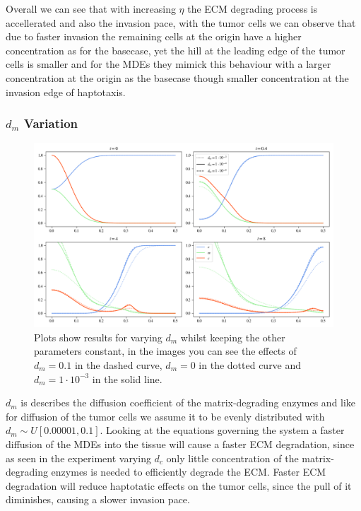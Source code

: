 Overall we can see that with increasing $\eta$ the ECM degrading process is accellerated and also the invasion pace, with the tumor cells we can observe that due to faster invasion the remaining cells at the origin have a higher concentration as for the basecase, yet the hill at the leading edge of the tumor cells is smaller and for the MDEs they mimick this behaviour with a larger concentration at the origin as the basecase though smaller concentration at the invasion edge of haptotaxis.

\subsubsection*{$d_m$ Variation}
\begin{figure}[h]
    \centering
    \includegraphics[width=\textwidth]{resources/images/dm_variation.png}
    \caption{Plots show results for varying $d_m$ whilst keeping the other parameters constant, in the images you can see the effects of $d_m=0.1$ in the dashed curve, $d_m=0$ in the dotted curve and $d_m=1\cdot 10^{-3}$ in the solid line.}
    \label{fig:dm_variation}
\end{figure}
$d_m$ is describes the diffusion coefficient of the matrix-degrading enzymes and like for diffusion of the tumor cells we assume it to be evenly distributed with $d_m \sim U[0.00001,0.1]$. Looking at the equations governing the system a faster diffusion of the MDEs into the tissue will cause a faster ECM degradation, since as seen in the experiment varying $d_c$ only little concentration of the matrix-degrading enzymes is needed to efficiently degrade the ECM. Faster ECM degradation will reduce haptotatic effects on the tumor cells, since the pull of it diminishes, causing a slower invasion pace. \newline 
